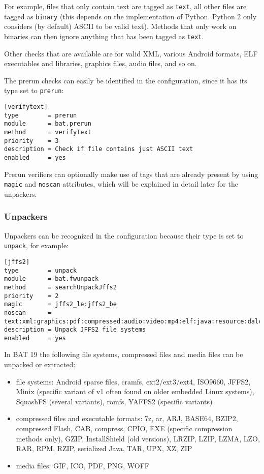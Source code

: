 \documentclass[10pt]{article}
\begin{document}
For example, files that only contain text are tagged as \texttt{text}, all other
files are tagged as \texttt{binary} (this depends on the implementation of
Python. Python 2 only considers (by default) ASCII to be valid text). Methods
that only work on binaries can then ignore anything that has been tagged as
\texttt{text}.

Other checks that are available are for valid XML, various Android formats,
ELF executables and libraries, graphics files, audio files, and so on.

The prerun checks can easily be identified in the configuration, since it has
its type set to \texttt{prerun}:

\begin{verbatim}
[verifytext]
type        = prerun
module      = bat.prerun
method      = verifyText
priority    = 3
description = Check if file contains just ASCII text
enabled     = yes
\end{verbatim}

Prerun verifiers can optionally make use of tags that are already present by
using \texttt{magic} and \texttt{noscan} attributes, which will be explained
in detail later for the unpackers.

\subsubsection{Unpackers}

Unpackers can be recognized in the configuration because their type is set
to \texttt{unpack}, for example:

\begin{verbatim}
[jffs2]
type        = unpack
module      = bat.fwunpack
method      = searchUnpackJffs2
priority    = 2
magic       = jffs2_le:jffs2_be
noscan      = text:xml:graphics:pdf:compressed:audio:video:mp4:elf:java:resource:dalvik
description = Unpack JFFS2 file systems
enabled     = yes
\end{verbatim}

In BAT 19 the following file systems, compressed files and media files can be
unpacked or extracted:

\begin{itemize}
\item file systems: Android sparse files, cramfs, ext2/ext3/ext4, ISO9660,
JFFS2, Minix (specific variant of v1 often found on older embedded Linux
systems), SquashFS (several variants), romfs, YAFFS2 (specific variants)
\item compressed files and executable formats: 7z, ar, ARJ, BASE64, BZIP2,
compressed Flash, CAB, compress, CPIO, EXE (specific compression methods only),
GZIP, InstallShield (old versions), LRZIP, LZIP, LZMA, LZO, RAR, RPM, RZIP,
serialized Java, TAR, UPX, XZ, ZIP
\item media files: GIF, ICO, PDF, PNG, WOFF
\end{itemize}
\end{document}
